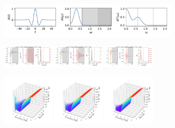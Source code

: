 \documentclass[a4paper]{article}
\begin{document}
\begin{figure}[H]
  \centering
  \includegraphics[width=0.8\textwidth]{A1.pdf}
\end{figure}
\begin{figure}[H]
  \centering
  \includegraphics[width=0.23\textwidth]{HL-A1-v0-imp0.pdf}
  \includegraphics[width=0.23\textwidth]{HL-A1-v1-imp0.pdf}
  \includegraphics[width=0.23\textwidth]{HL-A1-v2-imp0.pdf}
\end{figure}
\begin{figure}[H]
  \centering
  \includegraphics[width=0.23\textwidth]{cond3d_real-A1-v0-imp0.pdf}
  \includegraphics[width=0.23\textwidth]{cond3d_real-A1-v1-imp0.pdf}
  \includegraphics[width=0.23\textwidth]{cond3d_real-A1-v2-imp0.pdf}
\end{figure}
\end{document}
